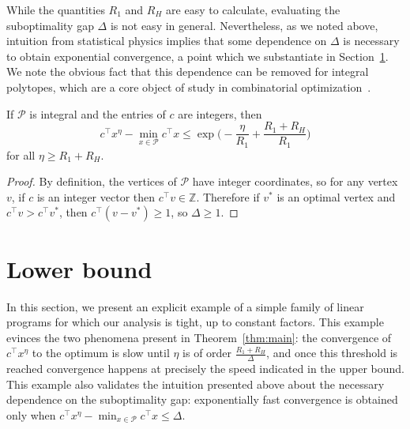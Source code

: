 \documentclass[final,12pt]{colt2018}
\newcommand{\cP}{\mathcal{P}}
\newcommand{\ZZ}{\mathbb{Z}}
\newcommand{\1}{\mathds{1}}
\begin{document}
While the quantities $R_1$ and $R_H$ are easy to calculate, evaluating the suboptimality gap $\Delta$ is not easy in general.
Nevertheless, as we noted above, intuition from statistical physics implies that some dependence on $\Delta$ is necessary to obtain exponential convergence, a point which we substantiate in Section~\ref{sec:lower}.
We note the obvious fact that this dependence can be removed for integral polytopes, which are a core object of study in combinatorial optimization~\citep{Sch03}.
\begin{corollary}\label{cor:integrality}
If $\cP$ is integral and the entries of $c$ are integers, then
\begin{equation*}
c^\top x^\eta - \min_{x \in \cP} c^\top x \leq \exp\Big(- \frac{\eta}{R_1} + \frac{R_1 + R_H}{R_1}\Big)
\end{equation*}
for all $\eta \geq R_1 + R_H$.
\end{corollary}
\begin{proof}
By definition, the vertices of $\cP$ have integer coordinates, so for any vertex $v$, if $c$ is an integer vector then $c^\top v \in \ZZ$.
Therefore if $v^*$ is an optimal vertex and $c^\top v > c^\top v^*$, then $c^\top (v - v^*) \geq 1$, so $\Delta \geq 1$.
\end{proof}
\section{Lower bound}\label{sec:lower}
In this section, we present an explicit example of a simple family of linear programs for which our analysis is tight, up to constant factors.
This example evinces the two phenomena present in Theorem~\ref{thm:main}: the convergence of $c^\top x^\eta$ to the optimum is slow until $\eta$ is of order $\frac{R_1 + R_H}{\Delta}$, and once this threshold is reached convergence happens at precisely the speed indicated in the upper bound.
This example also validates the intuition presented above about the necessary dependence on the suboptimality gap: exponentially fast convergence is obtained only when $c^\top x^\eta - \min_{x \in \cP} c^\top x \leq \Delta$.
\end{document}
